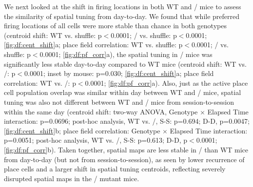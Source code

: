 We next looked at the shift in firing locations in both WT and \df/ mice to assess the similarity of spatial tuning from day-to-day. We found that while preferred firing locations of all cells were more stable than chance in both genotypes (centroid shift: WT vs. shuffle: p$<$0.0001; \df/ vs. shuffle: p$<$0.0001; \autoref{fig:df:cent_shift}a; place field correlation: WT vs. shuffle: p$<$0.0001; \df/ vs. shuffle: p$<$0.0001; \autoref{fig:df:pf_corr}a), the spatial tuning in \df/ mice was significantly less stable day-to-day compared to WT mice (centroid shift: WT vs. \df/: p$<$0.0001; inset by mouse: p=0.030; \autoref{fig:df:cent_shift}a; place field correlation: WT vs. \df/: p$<$0.0001; \autoref{fig:df:pf_corr}a). Also, just as the active place cell population overlap was similar within day between WT and \df/ mice, spatial tuning was also not different between WT and \df/ mice from session-to-session within the same day (centroid shift: two-way ANOVA, Genotype $\times$ Elapsed Time interaction: p=0.0696; post-hoc analysis, WT vs. \df/, S-S: p=0.694; D-D, p=0.0047; \autoref{fig:df:cent_shift}b; place field correlation: Genotype $\times$ Elapsed Time interaction: p=0.0051; post-hoc analysis, WT vs. \df/, S-S: p=0.613; D-D, p$<$0.0001; \autoref{fig:df:pf_corr}b). Taken together, spatial maps are less stable in \df/ than WT mice from day-to-day (but not from session-to-session), as seen by lower recurrence of place cells and a larger shift in spatial tuning centroids, reflecting severely disrupted spatial maps in the \df/ mutant mice.

